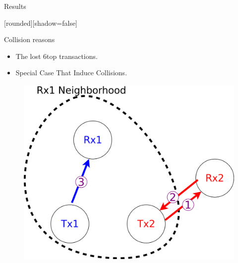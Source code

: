 \begin{withoutheadline}
\begin{frame}{ Results}


[rounded][shadow=false]


\begin{block}{Collision reasons}

    \begin{itemize}
    \item The lost 6top transactions. 
\item Special Case That Induce Collisions.
    
     
    
    \end{itemize}
    \end{block}

\centering
\begin{figure}[p]

\item\includegraphics[width=0.4\linewidth]{figures/pro.png}
\end{figure}

\end{frame}
\end{withoutheadline}


